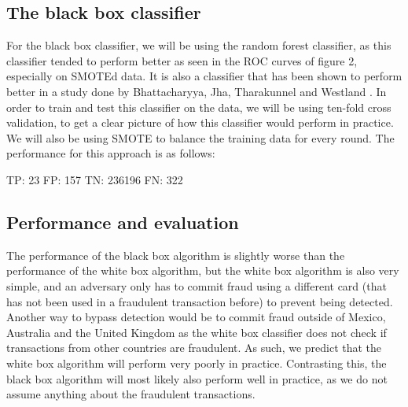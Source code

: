\documentclass[]{article}
\begin{document}
\subsection{The black box classifier}
For the black box classifier, we will be using the random forest classifier, as this classifier tended to perform better as seen in the ROC curves of figure 2, especially on SMOTEd data. It is also a classifier that has been shown to perform better in a study done by Bhattacharyya, Jha, Tharakunnel and Westland \cite{bhattacharyya2011data}. In order to train and test this classifier on the data, we will be using ten-fold cross validation, to get a clear picture of how this classifier would perform in practice. We will also be using SMOTE to balance the training data for every round. The performance for this approach is as follows:

\begin{flushleft}
	TP: 23 \newline
	FP: 157  \newline
	TN: 236196 \newline
	FN: 322 \newline
\end{flushleft}
\subsection{Performance and evaluation}
The performance of the black box algorithm is slightly worse than the performance of the white box algorithm, but the white box algorithm is also very simple, and an adversary only has to commit fraud using a different card (that has not been used in a fraudulent transaction before) to prevent being detected. Another way to bypass detection would be to commit fraud outside of Mexico, Australia and the United Kingdom as the white box classifier does not check if transactions from other countries are fraudulent. As such, we predict that the white box algorithm will perform very poorly in practice. Contrasting this, the black box algorithm will most likely also perform well in practice, as we do not assume anything about the fraudulent transactions.
\clearpage
\end{document}
